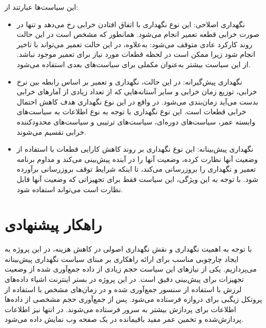 این سیاست‌ها عبارتند از:
\begin{itemize}
\item نگهداری اصلاحی: این نوع نگهداری با اتفاق افتادن خرابی رخ می‌دهد و تنها در صورت خرابی قطعه تعمیر انجام می‌شود. همانطور که مشخص است در این حالت روند کارکرد عادی متوقف می‌شود: به‌علاوه، در این حالت تعمیر می‌تواند با تاخیر انجام شود زیرا ممکن است در لحظه قطعات مورد نیاز برای تعمیر موجود نباشد. از این سیاست بیشتر به‌عنوان مکملی برای سیاست‌های بعدی استفاده می‌شود\cite{zhao2022review}.

\item نگهداری پیش‌گیرانه: در این حالت، نگهداری و تعمیر بر اساس رابطه بین نرخ خرابی، توزیع زمان خرابی و سایر آستانه‌هایی که از تعداد زیادی از آمارهای خرابی بدست می‌آید زمان‌بندی می‌شود. در واقع در این نوع نگهداری هدف کاهش احتمال خرابی قطعات است. این نوع نگهداری با توجه به نوع اطلاعات به سیاست‌های وابسته عمر، سیاست‌های دوره‌ای، سیاست‌های ترتیبی و سیاست‌های محدودکننده خرابی تقسیم می‌شوند\cite{zhao2022review}.

\item نگهداری پیش‌بینانه: این نوع نگهداری بر روند کاهش کارایی قطعات با استفاده از وضعیت آنها نظارت کرده، وضعیت آنها را در آینده پیش‌بینی می‌کند و مداوم برنامه تعمیر و نگهداری را بروزرسانی می‌کند، تا اینکه شرایط توقف بروزرسانی برآورده شود. با توجه به این ویژگی، این سیاست فقط برای تجهیزاتی که وضعیت آنها قابل نظارت است می‌تواند استفاده شود\cite{zhao2022review}.
\end{itemize} 

\section{راهکار پیشنهادی}

با توجه به اهمیت نگهداری و نقش نگهداری اصولی در کاهش هزینه، در این پروژه به ایجاد چارچوبی مناسب برای ارائه راهکاری بر مبنای سیاست نگهداری پیش‌بینانه می‌پردازیم. یکی از نیازهای این سیاست حجم زیادی از داده جمع‌آوری شده از وضعیت تجهیزات برای پیش‌بینی دقیق است. در این پروژه در بستر اینترنت اشیاء داده‌های لرزش با استفاده از سنسور  جمع‌آوری شده و در زمان‌های مشخص با استفاده از پروتکل زیگبی برای دروازه فرستاده می‌شود. پس از جمع‌آوری حجم مشخصی از داده‌ها اطلاعات برای پردازش بیشتر به سرور فرستاده می‌شوند. در انتها نیز اطلاعات پردازش‌شده و تخمین عمر مفید باقیمانده در یک صفحه وب نمایش داده می‌شود.

